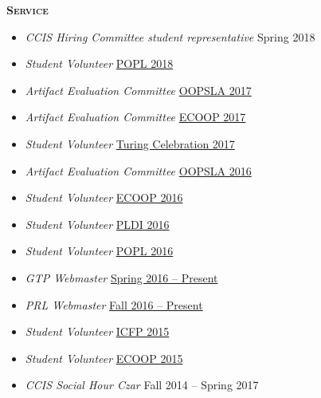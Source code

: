 \documentclass{article}
\newcommand{\mysection}[1]{\vspace{0.5cm}
\hspace{-1.3cm}\textsc{\textbf{#1}}~\hrulefill}
\begin{document}
\mysection{Service}
\begin{itemize}
\item \emph{CCIS Hiring Committee student representative} \hfill {Spring 2018}
\item \emph{Student Volunteer} \hfill \href{http://conf.researchr.org/home/POPL-2018}{POPL 2018}
\item \emph{Artifact Evaluation Committee} \hfill \href{https://2017.splashcon.org/track/splash-2017-OOPSLA-Artifacts}{OOPSLA 2017}
\item \emph{Artifact Evaluation Committee} \hfill \href{https://2017.ecoop.org/track/ecoop-2017-Artifacts}{ECOOP 2017}
\item \emph{Student Volunteer} \hfill \href{https://www.acm.org/turing-award-50/conference}{Turing Celebration 2017}
\item \emph{Artifact Evaluation Committee} \hfill \href{http://2016.splashcon.org/track/splash-2016-artifacts}{OOPSLA 2016}
\item \emph{Student Volunteer} \hfill \href{http://2016.ecoop.org/}{ECOOP 2016}
\item \emph{Student Volunteer} \hfill \href{http://conf.researchr.org/home/PLDI-2016}{PLDI 2016}
\item \emph{Student Volunteer} \hfill \href{http://conf.researchr.org/home/POPL-2016}{POPL 2016}
\item \emph{GTP Webmaster} \hfill \href{https://github.com/nuprl/gtp.github.io}{Spring 2016 -- Present}
\item \emph{PRL Webmaster} \hfill \href{https://github.com/nuprl/website}{Fall 2016 -- Present}
\item \emph{Student Volunteer} \hfill \href{http://icfpconference.org/icfp2015/}{ICFP 2015}
\item \emph{Student Volunteer} \hfill \href{http://2015.ecoop.org/}{ECOOP 2015}
\item \emph{CCIS Social Hour Czar} \hfill {Fall 2014 -- Spring 2017}
\end{itemize}
\end{document}
